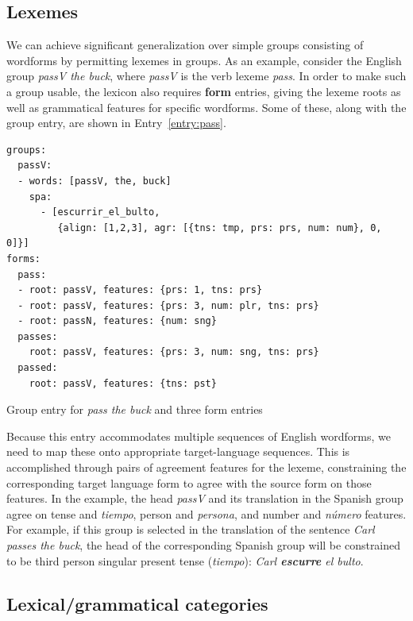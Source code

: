 \documentclass[11pt, a4paper]{article}
\begin{document}
\subsection{Lexemes}
\label{subsect:lexeme}

We can achieve significant generalization over simple groups consisting of wordforms by
permitting lexemes in groups.
As an example, consider the English group \textit{passV the buck}, where \textit{passV} is
the verb lexeme \textit{pass}.
In order to make such a group usable, the lexicon also requires \textbf{form} entries,
giving the lexeme roots as well as grammatical features for specific wordforms.
Some of these, along with the group entry, are shown in Entry~\ref{entry:pass}.

\begin{entry}
\small
\begin{verbatim}
groups:
  passV:
  - words: [passV, the, buck]
    spa:
      - [escurrir_el_bulto,
         {align: [1,2,3], agr: [{tns: tmp, prs: prs, num: num}, 0, 0]}]
forms:
  pass:
  - root: passV, features: {prs: 1, tns: prs}
  - root: passV, features: {prs: 3, num: plr, tns: prs}
  - root: passN, features: {num: sng}
  passes:
    root: passV, features: {prs: 3, num: sng, tns: prs}
  passed:
    root: passV, features: {tns: pst}
\end{verbatim}
\normalsize
\caption{Group entry for \textit{pass the buck} and three form entries}
\label{entry:pass}
\end{entry}

Because this entry accommodates multiple sequences of English wordforms,
we need to map these onto appropriate target-language sequences.
This is accomplished through pairs of agreement features
for the lexeme, constraining the corresponding target language form to agree with the source
form on those features.
In the example, the
head \textit{passV} and its translation in the Spanish group agree on
tense and \textit{tiempo}, person and \textit{persona}, and number and \textit{n\'{u}mero} features.
For example, if this group is selected in the translation of the sentence \textit{Carl passes the buck},
the head of the corresponding Spanish group will be constrained to be
third person singular present tense (\textit{tiempo}):
\textit{Carl \textbf{escurre} el bulto}.

\subsection{Lexical/grammatical categories}
\label{subsect:cats}
\end{document}
